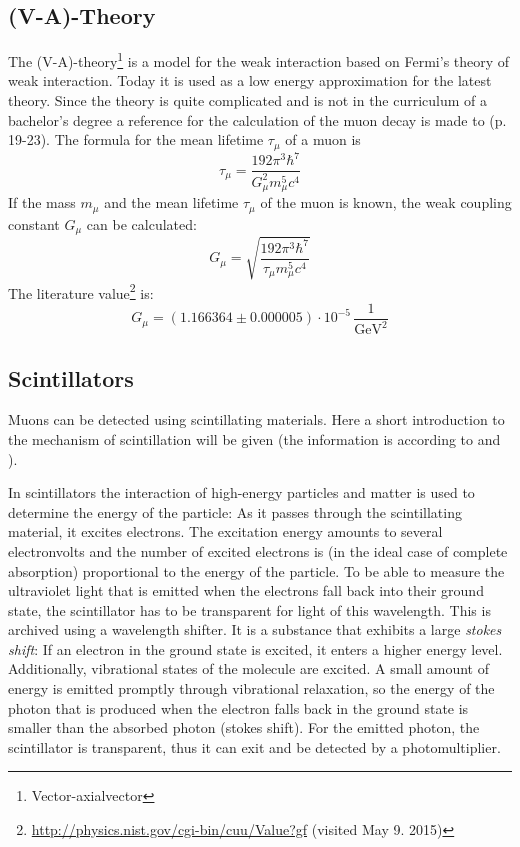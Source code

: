 \subsection{(V-A)-Theory}
The (V-A)-theory\footnote{Vector-axialvector} is a model for the weak interaction based on Fermi's theory of weak interaction. Today it is 
used as a low energy approximation for the latest theory. Since the theory is quite complicated and is not in the curriculum of a bachelor's 
degree a reference for the calculation of the muon decay is made to \cite{staatsex} (p. 19-23). The formula for the mean lifetime $\tau_\mu$ of a muon is
\begin{equation}
    \tau_\mu = \frac{192 \pi^3 \hbar^7}{G_\mu^2 m_\mu^5 c^4}
\end{equation}
If the mass $m_\mu$ and the mean lifetime $\tau_\mu$ of the muon is known, the weak coupling constant $G_\mu$ can be calculated:
\begin{equation}
    \label{eq:weakcouplingconstant}
    G_\mu = \sqrt{\frac{192 \pi^3 \hbar^7}{\tau_\mu m_\mu^5 c^4}}
\end{equation}
The literature value\footnote{\url{http://physics.nist.gov/cgi-bin/cuu/Value?gf} (visited May 9. 2015)} is:
\begin{equation}
    \label{eq:litval:weakcouplingconstant}
    G_\mu = \left( 1.166364 \pm 0.000005 \right) \cdot 10^{-5}\,\frac{1}{\text{GeV}^2}
\end{equation}


\subsection{Scintillators}
Muons can be detected using scintillating materials.
Here a short introduction to the mechanism of scintillation will be given
(the information is according to \cite{dem4} and \cite{staatsex}).

In scintillators the interaction of high-energy particles and matter is used to determine
the energy of the particle:
As it passes through the scintillating material, it excites electrons.
The excitation energy amounts to several electronvolts and the number of excited electrons is (in the ideal case
of complete absorption) proportional to the energy of the particle.
To be able to measure the ultraviolet light that is emitted when the electrons fall back into their ground state,
the scintillator has to be transparent for light of this wavelength.
This is archived using a wavelength shifter.
It is a substance that exhibits a large \emph{stokes shift}:
If an electron in the ground state is excited, it enters a higher energy level.
Additionally, vibrational states of the molecule are excited.
A small amount of energy is emitted promptly through vibrational relaxation,
so the energy of the photon that is produced when the electron falls back in the ground state
is smaller than the absorbed photon (stokes shift).
For the emitted photon, the scintillator is transparent,
thus it can exit and be detected by a photomultiplier.





